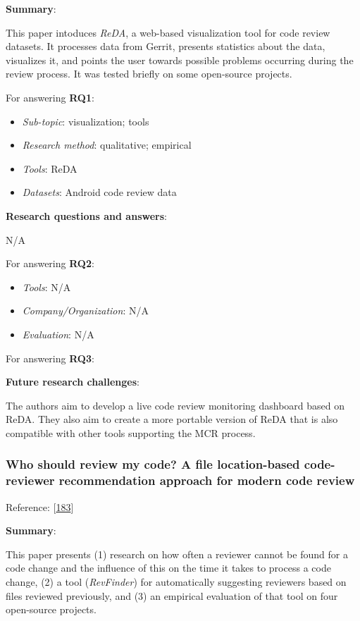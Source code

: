 \documentclass[]{book}
\providecommand{\tightlist}{%
  \setlength{\itemsep}{0pt}\setlength{\parskip}{0pt}}
\begin{document}
\textbf{Summary}:

This paper intoduces \emph{ReDA}, a web-based visualization tool for
code review datasets. It processes data from Gerrit, presents statistics
about the data, visualizes it, and points the user towards possible
problems occurring during the review process. It was tested briefly on
some open-source projects.

For answering \textbf{RQ1}:

\begin{itemize}
\tightlist
\item
  \emph{Sub-topic}: visualization; tools
\item
  \emph{Research method}: qualitative; empirical
\item
  \emph{Tools}: ReDA
\item
  \emph{Datasets}: Android code review data
\end{itemize}

\textbf{Research questions and answers}:

N/A

For answering \textbf{RQ2}:

\begin{itemize}
\tightlist
\item
  \emph{Tools}: N/A
\item
  \emph{Company/Organization}: N/A
\item
  \emph{Evaluation}: N/A
\end{itemize}

For answering \textbf{RQ3}:

\textbf{Future research challenges}:

The authors aim to develop a live code review monitoring dashboard based
on ReDA. They also aim to create a more portable version of ReDA that is
also compatible with other tools supporting the MCR process.

\subsubsection{Who should review my code? A file location-based
code-reviewer recommendation approach for modern code
review}\label{who-should-review-my-code-a-file-location-based-code-reviewer-recommendation-approach-for-modern-code-review}

Reference: {[}\protect\hyperlink{ref-thongtanunam2015should}{183}{]}

\textbf{Summary}:

This paper presents (1) research on how often a reviewer cannot be found
for a code change and the influence of this on the time it takes to
process a code change, (2) a tool (\emph{RevFinder}) for automatically
suggesting reviewers based on files reviewed previously, and (3) an
empirical evaluation of that tool on four open-source projects.
\end{document}

